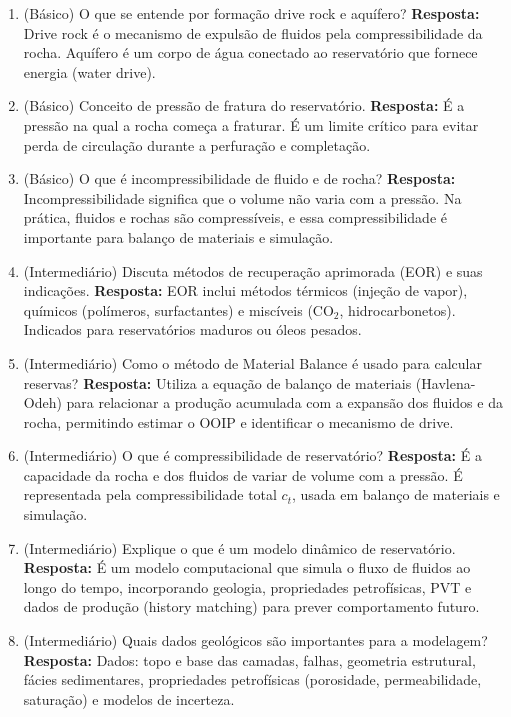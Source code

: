 \documentclass[11pt,a4paper]{article}
\begin{document}
\begin{enumerate}
  \item (Básico) O que se entende por formação drive rock e aquífero?
  \textbf{Resposta:} Drive rock é o mecanismo de expulsão de fluidos pela compressibilidade da rocha. Aquífero é um corpo de água conectado ao reservatório que fornece energia (water drive).

  \item (Básico) Conceito de pressão de fratura do reservatório.
  \textbf{Resposta:} É a pressão na qual a rocha começa a fraturar. É um limite crítico para evitar perda de circulação durante a perfuração e completação.

  \item (Básico) O que é incompressibilidade de fluido e de rocha?
  \textbf{Resposta:} Incompressibilidade significa que o volume não varia com a pressão. Na prática, fluidos e rochas são compressíveis, e essa compressibilidade é importante para balanço de materiais e simulação.

  \item (Intermediário) Discuta métodos de recuperação aprimorada (EOR) e suas indicações.
  \textbf{Resposta:} EOR inclui métodos térmicos (injeção de vapor), químicos (polímeros, surfactantes) e miscíveis (CO$_2$, hidrocarbonetos). Indicados para reservatórios maduros ou óleos pesados.

  \item (Intermediário) Como o método de Material Balance é usado para calcular reservas?
  \textbf{Resposta:} Utiliza a equação de balanço de materiais (Havlena-Odeh) para relacionar a produção acumulada com a expansão dos fluidos e da rocha, permitindo estimar o OOIP e identificar o mecanismo de drive.

  \item (Intermediário) O que é compressibilidade de reservatório?
  \textbf{Resposta:} É a capacidade da rocha e dos fluidos de variar de volume com a pressão. É representada pela compressibilidade total $c_t$, usada em balanço de materiais e simulação.

  \item (Intermediário) Explique o que é um modelo dinâmico de reservatório.
  \textbf{Resposta:} É um modelo computacional que simula o fluxo de fluidos ao longo do tempo, incorporando geologia, propriedades petrofísicas, PVT e dados de produção (history matching) para prever comportamento futuro.

  \item (Intermediário) Quais dados geológicos são importantes para a modelagem?
  \textbf{Resposta:} Dados: topo e base das camadas, falhas, geometria estrutural, fácies sedimentares, propriedades petrofísicas (porosidade, permeabilidade, saturação) e modelos de incerteza.


\end{enumerate}
\end{document}
